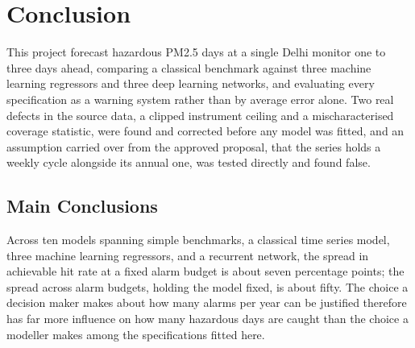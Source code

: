\documentclass[12pt,a4paper]{report}
\begin{document}
\chapter{Conclusion}
\label{chap:conclusion}

This project forecast hazardous PM2.5 days at a single Delhi monitor one to
three days ahead, comparing a classical benchmark against three machine
learning regressors and three deep learning networks, and evaluating every
specification as a warning system rather than by average error alone. Two
real defects in the source data, a clipped instrument ceiling and a
mischaracterised coverage statistic, were found and corrected before any
model was fitted, and an assumption carried over from the approved proposal,
that the series holds a weekly cycle alongside its annual one, was tested
directly and found false.

\begin{table}[htbp]
\centering
\caption{The three research questions from Chapter~\ref{chap:intro},
their headline quantitative answers beside them, read back from the same
results Chapter~\ref{chap:results} computes rather than restated from
memory.}
\label{tab:rq-summary}

\end{table}

\section{Main Conclusions}

Across ten models spanning simple benchmarks, a classical time series model,
three machine learning regressors, and a recurrent network, the spread in
achievable hit rate at a fixed alarm budget is about seven percentage points;
the spread across alarm budgets, holding the model fixed, is about fifty. The
choice a decision maker makes about how many alarms per year can be
justified therefore has far more influence on how many hazardous days are
caught than the choice a modeller makes among the specifications fitted
here.
\end{document}
